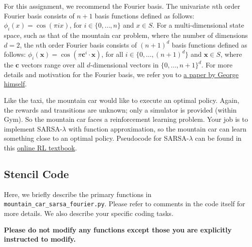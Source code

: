\documentclass{article}
\begin{document}
For this assignment, we recommend the Fourier basis.  The univariate
$n$th order Fourier basis consists of $n+1$ basis functions defined as
follows: $\phi_i(x) = \cos (\pi i x)$, for $i \in \{ 0, \ldots, n \}$
and $x \in S$.  For a multi-dimensional state space, such as that of
the mountain car problem, where the number of dimensions $d = 2$, the
$n$th order Fourier basis consists of $(n+1)^d$ basis functions
defined as follows: $\phi_i(\bm{x}) = \cos (\pi \bm{c}^i \cdot
\bm{x})$, for all $i \in \{ 0, \ldots, (n+1)^d \}$ and $\bm{x} \in S$,
where the $\bm{c}$ vectors range over all $d$-dimensional vectors in
$\{ 0, \ldots, n+1 \}^d$.  For more details and motivation for the
Fourier basis, we refer you to
\href{http://cs.brown.edu/people/gdk/pubs/fourier.pdf}{a paper by
  George himself}.

Like the taxi, the mountain car would like to execute an optimal
policy.  Again, the rewards and transitions are unknown; only a
simulator is provided (within Gym).  So the mountain car faces a
reinforcement learning problem.  Your job is to implement
SARSA-$\lambda$ with function approximation, so the mountain car can
learn something close to an optimal policy.  Pseudocode for
SARSA-$\lambda$ can be found in this
\href{http://incompleteideas.net/book/first/ebook/node89.html}{online
  RL textbook}.


\subsection{Stencil Code}
Here, we briefly describe the primary functions in
\texttt{mountain\_car\_sarsa\_fourier.py}.  Please refer to comments
in the code itself for more details.  We also describe your specific
coding tasks.

\textbf{Please do not modify any functions except those you are
  explicitly instructed to modify.}
\end{document}
